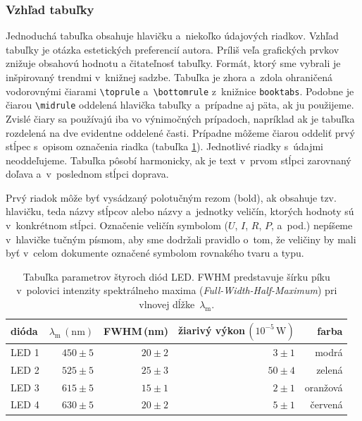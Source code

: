 \subsubsection{Vzhľad tabuľky}
Jednoduchá tabuľka obsahuje hlavičku a~niekoľko
údajových riadkov.
Vzhľad tabuľky je otázka estetických preferencií autora.
Príliš veľa grafických prvkov znižuje obsahovú hodnotu a čitateľnosť tabuľky.
Formát, ktorý sme vybrali je inšpirovaný trendmi
v~knižnej sadzbe.
Tabuľka je zhora a~zdola ohraničená vodorovnými čiarami
\verb|\toprule| a~\verb|\bottomrule| z~knižnice \verb|booktabs|.
Podobne je čiarou \verb|\midrule| oddelená hlavička tabuľky
a~prípadne aj päta, ak ju použijeme.
Zvislé čiary sa používajú iba vo výnimočných prípadoch,
napríklad ak je tabuľka rozdelená na
dve evidentne oddelené časti.
Prípadne môžeme čiarou oddeliť prvý stĺpec s~opisom označenia riadka (tabuľka \ref{tab:LED}).
Jednotlivé riadky s~údajmi neoddeľujeme.
Tabuľka pôsobí harmonicky,
ak je text v~prvom stĺpci zarovnaný doľava
a~v~poslednom stĺpci doprava.

Prvý riadok môže byť vysádzaný polotučným
rezom (bold),
ak obsahuje tzv. hlavičku, teda názvy stĺpcov alebo názvy
a~jednotky veličín, ktorých hodnoty sú v~konkrétnom stĺpci.
Označenie veličín symbolom ($U$, $I$, $R$, $P$, a~pod.)
nepíšeme v~hlavičke tučným písmom,
aby sme dodržali pravidlo o~tom,
že veličiny by mali byť v~celom dokumente označené symbolom
rovnakého tvaru a typu.

\begin{table}[!ht]
  \caption{Tabuľka parametrov štyroch diód LED.
  FWHM predstavuje šírku píku v~polovici intenzity
  spektrálneho maxima (\foreignlanguage{english}{\emph{Full-Width-Half-Maximum}}) pri vlnovej dĺžke~$\lambda_\mathrm m$.}
  \label{tab:LED}
  \centering
  \begin{tabular}{@{}l|rrrr@{}}
    \toprule
    dióda & $\lambda_\mathrm m\,(\mathrm{nm})$ & FWHM\,(nm) & žiarivý výkon\,$(10^{-5}\,\mathrm W)$ & farba \\
    \midrule
    LED 1 & $450 \pm 5$ & $20\pm2$ & $3\pm1$ & modrá\\
    LED 2 & $525 \pm 5$ & $25\pm3$ & $50\pm4$ & zelená\\
    LED 3 & $615 \pm 5$ & $15\pm1$ & $2\pm1$ & oranžová\\
    LED 4 & $630 \pm 5$ & $20\pm2$ & $5\pm1$ & červená\\
    \bottomrule
  \end{tabular}
\end{table}

